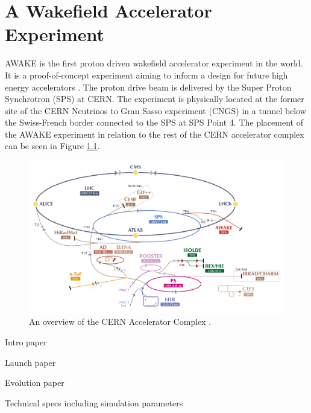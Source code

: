 %
%

\chapter{A Wakefield Accelerator Experiment}
\label{Ch:WFA}

AWAKE is the first proton driven wakefield accelerator experiment in the world. It is a proof-of-concept experiment aiming to inform a design for future high energy accelerators \cite{gschwendtner:2016}. The proton drive beam is delivered by the Super Proton Synchrotron (SPS) at CERN. The experiment is physically located at the former site of the CERN Neutrinos to Gran Sasso experiment (CNGS) \cite{gschwendtner:2010} in a tunnel below the Swiss-French border connected to the SPS at SPS Point 4. The placement of the AWAKE experiment in relation to the rest of the CERN accelerator complex can be seen in Figure \ref{Fig:WFA:AccComp}.

\begin{figure}[hbt]
    \centering
    \includegraphics[width=0.99\linewidth,trim={20mm 0mm 20mm 0mm},clip]{figures/AcceleratorComplex}
    \caption{\label{Fig:WFA:AccComp} An overview of the CERN Accelerator Complex \cite{add:mobs:2016}.}
\end{figure}



Intro paper \cite{caldwell:2009}

Launch paper \cite{awake_collaboration:2014}

Evolution paper \cite{caldwell:2016}

Technical specs including simulation parameters \cite{gschwendtner:2016}


